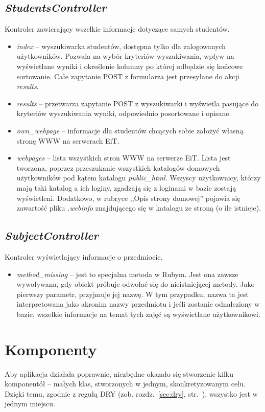 \documentclass[a4paper,12pt,oneside]{report}
\begin{document}
\subsection{\emph{StudentsController}}
\label{con:students}
  Kontroler zawierający wszelkie informacje dotyczące samych studentów.
\begin{itemize}
  \item \emph{index} -- wyszukiwarka studentów, dostępna tylko dla zalogowanych użytkowników. Pozwala na wybór kryteriów wyszukiwania, wpływ na wyświetlane wyniki i określenie kolumny po której odbędzie się końcowe sortowanie. Całe zapytanie POST z formularza jest przesyłane do akcji \emph{results}.
  \item \emph{results} -- przetwarza zapytanie POST z wyszukiwarki i wyświetla pasujące do kryteriów wyszukiwania wyniki, odpowiednio posortowane i opisane.
  \item \emph{own\_webpage} -- informacje dla studentów chcących sobie założyć własną stronę WWW na serwerach EiT.
  \item \emph{webpages} -- lista wszystkich stron WWW na serwerze EiT. Lista jest tworzona, poprzez przeszukanie wszystkich katalogów domowych użytkowników pod kątem katalogu \emph{public\_html}. Wszyscy użytkownicy, którzy mają taki katalog a ich loginy, zgadzają się z loginami w bazie zostają wyświetleni. Dodatkowo, w rubryce ,,Opis strony domowej'' pojawia się zawartość pliku \emph{.webinfo} znajdującego się w katalogu ze stroną (o ile istnieje).
\end{itemize}

\subsection{\emph{SubjectController}}
\label{con:subject}
  Kontroler wyświetlający informacje o przedmiocie.
\begin{itemize}
  \item \emph{method\_missing} -- jest to specjalna metoda w Rubym. Jest ona zawsze wywoływana, gdy obiekt próbuje odwołać się do nieistniejącej metody. Jako pierwszy parametr, przyjmuje jej nazwę. W tym przypadku, nazwa ta jest interpretowana jako akronim nazwy przedmiotu i jeśli zostanie odnaleziony w bazie, wszelkie informacje na temat tych zajęć są wyświetlane użytkownikowi.
\end{itemize}

\section{Komponenty}
\label{sec:components}
  Aby aplikacja działała poprawnie, niezbędne okazało się stworzenie kilku komponentół -- małych klas, stworzonych w jednym, skonkretyzowanym celu. Dzięki temu, zgodnie z regułą DRY (zob. rozdz.~\ref{sec:dry}, str.~\pageref{sec:dry}), wszystko jest w jednym miejscu.
\end{document}

